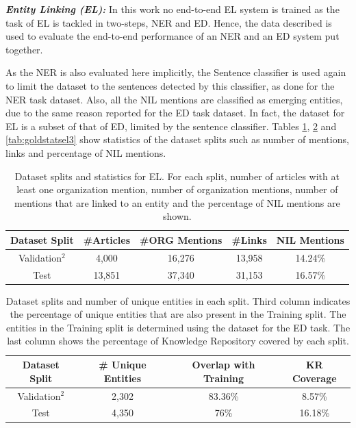 \documentclass{report}
\theoremstyle{definition}
\theoremstyle{remark}
\begin{document}
\noindent \textit{\textbf{Entity Linking (EL):}} In this work no end-to-end EL system is trained as the task of EL is tackled in two-steps, NER and ED. Hence, the data described is used to evaluate the end-to-end performance of an NER and an ED system put together. 

As the NER is also evaluated here implicitly, the Sentence classifier is used again to limit the dataset to the sentences detected by this classifier, as done for the NER task dataset. Also, all the NIL mentions are classified as emerging entities, due to the same reason reported for the ED task dataset. In fact, the dataset for EL is a subset of that of ED, limited by the sentence classifier. Tables \ref{tab:goldstatsel}, \ref{tab:goldstatsel2} and \ref{tab:goldstatsel3} show statistics of the dataset splits such as number of mentions, links and percentage of NIL mentions.

\begin{table}[H]
    \centering
    \begin{tabular}{ccccc}
     Dataset Split & \#Articles & \#ORG Mentions & \#Links & NIL Mentions  \\
     \hline
    Validation$^2$ & 4,000  & 16,276 & 13,958 & 14.24\% \\
    Test           & 13,851 & 37,340 & 31,153 & 16.57\% \\
    \end{tabular}
    \caption{Dataset splits and statistics for EL. For each split, number of articles with at least one organization mention, number of organization mentions, number of mentions that are linked to an entity and the percentage of NIL mentions are shown.}
    \label{tab:goldstatsel}
\end{table}


\begin{table}[H]
    \centering
    \begin{tabular}{cccc}
    Dataset Split & \# Unique Entities & Overlap with Training & KR Coverage\\
    \hline
    Validation$^2$ & 2,302 & 83.36\% & 8.57\%\\
    Test & 4,350 & 76\%& 16.18\%\\
    \end{tabular}
    \caption{Dataset splits and number of unique entities in each split. Third column indicates the percentage of unique entities that are also present in the Training split. The entities in the Training split is determined using the dataset for the ED task. The last column shows the percentage of Knowledge Repository covered by each split.}
    \label{tab:goldstatsel2}
\end{table}
\end{document}
